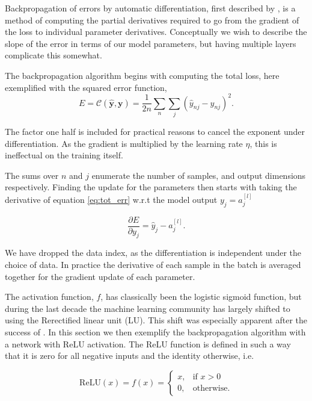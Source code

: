 Backpropagation of errors by automatic differentiation, first described by \citet{Linnainmaa1976}, is a method of computing the partial derivatives required to go from the gradient of the loss to individual parameter derivatives. Conceptually we wish to describe the slope of the error in terms of our model parameters, but having multiple layers complicate this somewhat. 

The backpropagation algorithm begins with computing the total loss, here exemplified with the squared error function,
\begin{equation}\label{eq:tot_err}
	E = \mathcal{C}(\mathbf{\hat{y}}, \mathbf{y}) = \frac{1}{2n}\sum_n \sum_j (\hat{y}_{nj}-y_{nj} )^2.
\end{equation}

\noindent The factor one half is included for practical reasons to cancel the exponent under differentiation. As the gradient is multiplied by the learning rate $\eta$, this is ineffectual on the training itself. 

The sums over $n$ and $j$ enumerate the number of samples, and output dimensions respectively. Finding the update for the parameters then starts with taking the derivative of equation \ref{eq:tot_err} w.r.t the model output $y_j  = a^{[l]}_j$

\begin{equation}\label{eq:err_grad}
	\frac{\partial E}{\partial y_{j}} = \hat{y}_{j} - a^{[l]}_j.
\end{equation}

\noindent We have dropped the data index, as the differentiation is independent under the choice of data. In practice the derivative of each sample in the batch is averaged together for the gradient update of each parameter. 

The activation function, $f$, has classically been the logistic sigmoid function, but during the last decade the machine learning community has largely shifted to using the Rerectified linear unit (LU). This shift was especially apparent after the success of \citet{Krizhevsky2012}. In this section we then exemplify the backpropagation algorithm with a network with ReLU activation. The ReLU function is defined in such a way that it is zero for all negative inputs and the identity otherwise, i.e. 

\begin{equation}\label{eq:relu}
	\text{ReLU} (x) = f(x) = \begin{cases}
	x, & \text{if } x > 0 \\
	0,  & \text{otherwise} .
	\end{cases}
\end{equation}

